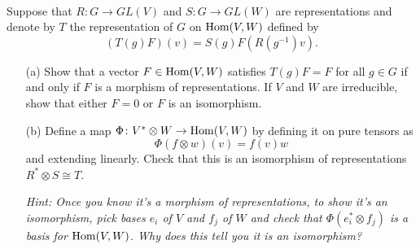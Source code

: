 \documentclass[12pt]{article}
\begin{document}
\iffalse
\begin{answer}
If $\sum t_{ij}e_i\otimes e_j$ is a pure tensor then it is equal to $\sum v_ie_i \otimes \sum w_je_j$ and hence $t_{ij}=v_iw_j$. This means $t_{11}t_{22}=v_1w_1v_2w_2=v_1w_2v_2w_1=t_{12}t_{21}$.

Conversely, suppose the Pl\"{u}cker relation holds. If all $t_{ij}=0$ then just take $v=w=0$. If one of the $t_{ij}\neq 0$ then (renumbering the basis) we can assume it is $t_{11}$. Then set $v_1=1$, $w_1=t_{11}$, $v_2=t_{21}/t_{11}$ and $w_2=t_{12}$. We get $v\otimes w=\sum t_{ij}e_i\otimes e_j$.
\end{answer}
\newpage
\fi

\bigskip

\begin{question}\ \\
Suppose that $R\colon G\to GL(V)$ and $S\colon G\to GL(W)$ are representations and denote by $T$ the representation of $G$ on $\operatorname{Hom}(V,W)$ defined by
\[(T(g)F)(v)=S(g)F(R(g^{-1})v).\]
\begin{enumerate}
\item[(a)] Show that a vector $F\in\operatorname{Hom}(V,W)$ satisfies $T(g)F=F$ for all $g\in G$ if and only if $F$ is a morphism of representations. If $V$ and $W$ are irreducible, show that either $F=0$ or $F$ is an isomorphism.
\item[(b)] Define a map $\Phi\colon V^*\otimes W\to\operatorname{Hom}(V,W)$ by defining it on pure tensors as
\[\Phi(f\otimes w)(v)=f(v)w\]
and extending linearly. Check that this is an isomorphism of representations $R^*\otimes S\cong T$.

{\em Hint: Once you know it's a morphism of representations, to show it's an isomorphism, pick bases $e_i$ of $V$ and $f_j$ of $W$ and check that $\Phi(e_i^*\otimes f_j)$ is a basis for $\operatorname{Hom}(V,W)$. Why does this tell you it is an isomorphism?}
\end{enumerate}
\end{question}
\end{document}
